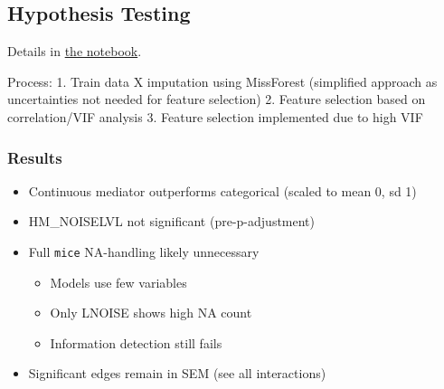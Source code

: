 \documentclass[
  letterpaper,
  DIV=11,
  numbers=noendperiod]{scrartcl}
\providecommand{\tightlist}{%
  \setlength{\itemsep}{0pt}\setlength{\parskip}{0pt}}\usepackage{longtable,booktabs,array}
\begin{document}
\subsection{Hypothesis Testing}\label{hypothesis-testing}

Details in \href{notebooks/hypothethis-tests.qmd}{the notebook}.

Process: 1. Train data X imputation using MissForest (simplified
approach as uncertainties not needed for feature selection) 2. Feature
selection based on correlation/VIF analysis 3. Feature selection
implemented due to high VIF

\subsubsection{Results}\label{results-1}

\begin{itemize}
\tightlist
\item
  Continuous mediator outperforms categorical (scaled to mean 0, sd 1)
\item
  HM\_NOISELVL not significant (pre-p-adjustment)
\item
  Full \texttt{mice} NA-handling likely unnecessary

  \begin{itemize}
  \tightlist
  \item
    Models use few variables
  \item
    Only LNOISE shows high NA count
  \item
    Information detection still fails
  \end{itemize}
\item
  Significant edges remain in SEM (see all interactions)
\end{itemize}
\end{document}
